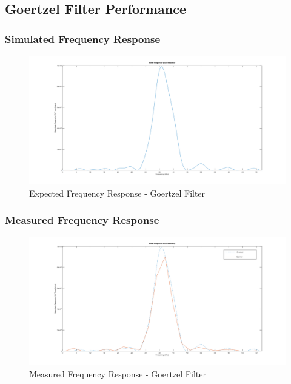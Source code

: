 \subsection{Goertzel Filter Performance}

\subsubsection{Simulated Frequency Response}

\begin{figure}[H]
	\centering
	\includegraphics[width=\linewidth]{figures/results/goertzel_filter_simulation_wide.png}
	\caption{Expected Frequency Response - Goertzel Filter}
	\label{fig:goertzel_filter_response_simulated}
\end{figure}


\subsubsection{Measured Frequency Response}

\begin{figure}[H]
	\centering
	\includegraphics[width=\linewidth]{figures/results/goertzel_filter_empirical_wide.png}
	\caption{Measured Frequency Response - Goertzel Filter}
	\label{fig:goertzel_filter_response_empirical}
\end{figure}

